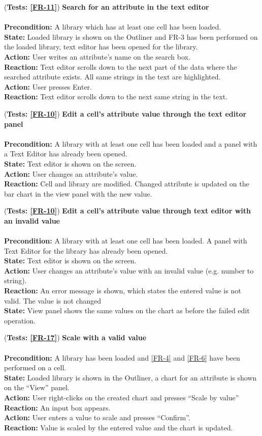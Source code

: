 \documentclass[10pt,a4paper]{report}
\newcommand{\precondition}[1]{
    \textbf{Precondition: } #1 \leavevmode \\
}
\newcommand{\action}[1]{
    \textbf{Action: } #1 \leavevmode \\
}
\newcommand{\state}[1]{
    \textbf{State: } #1 \leavevmode \\
}
\newcommand{\reaction}[1]{
    \textbf{Reaction: } #1 \leavevmode \\
}
\newcommand{\GTCDescription}[2]{
    (\textbf{Tests: #1}) \textbf{#2} \leavevmode \\
}
\begin{document}
\begin{GTC}
    \item \GTCDescription{\ref{FR-11}}
    {Search for an attribute in the text editor} \leavevmode \\ 
        \precondition{A library which has at least one cell has been loaded.}
        \state{Loaded library is shown on the Outliner and FR-3 has been performed on the loaded library, text editor has been opened for the library.}
        \action{User writes an attribute's name on the search box.}
        \reaction{Text editor scrolls down to the next part of the data where the searched attribute exists. All same strings in the text are highlighted.}
        \action{User presses Enter.}
        \reaction{Text editor scrolls down to the next same string in the text.}\label{GTC-37}
    
    \item \GTCDescription{\ref{FR-10}}
    {Edit a cell's attribute value through the text editor panel} \leavevmode \\ 
        \precondition{A library with at least one cell has been loaded and a panel with a Text Editor has already been opened.}
        \state{Text editor is shown on the screen.}
        \action{User changes an attribute's value.}
        \reaction{Cell and library are modified. Changed attribute is updated on the bar chart in the view panel with the new value.}\label{GTC-38}
    
    \item \GTCDescription{\ref{FR-10}}
    {Edit a cell's attribute value through text editor with an invalid value} \leavevmode \\ 
        \precondition{A library with at least one cell has been loaded. A panel with Text Editor for the library has already been opened.}
        \state{Text editor is shown on the screen.}
        \action{User changes an attribute's value with an invalid value (e.g. number to string).}
        \reaction{An error message is shown, which states the entered value is not valid. The value is not changed}
        \state{View panel shows the same values on the chart as before the failed edit operation.}\label{GTC-39}
    
    \item \GTCDescription{\ref{FR-17}}
    {Scale with a valid value} \leavevmode \\ 
        \precondition{A library has been loaded and \ref{FR-4} and \ref{FR-6} have been performed on a cell.}
        \state{Loaded library is shown in the Outliner, a chart for an attribute is shown on the “View” panel.}
        \action{User right-clicks on the created chart and presses “Scale by value”}
        \reaction{An input box appears.}
        \action{User enters a value to scale and presses “Confirm”.}
        \reaction{Value is scaled by the entered value and the chart is updated.}\label{GTC-40}
    

\end{GTC}
\end{document}
